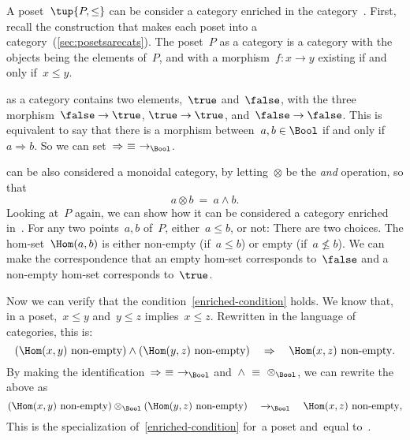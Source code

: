 \begin{example}
A poset~$\tup{P, \leq}$ can be consider a category enriched in the
category~\Bool. First, recall the construction that makes each poset into a
category~(\cref{sec:posetsarecats}). The poset~$P$ as a category is a category with the objects being the
elements of~$P$, and with a morphism~$f\colon x \to y$ existing if and only if~$x\leq y$.

\Bool as a category contains two elements,~$\true$ and~$\false$, with
the three morphism~$\false \to \true$, $\true \to \true$, and~$\false \to \false$. This is equivalent to say that there is a morphism between~$a, b \in \Bool$ if and only if~$a \Rightarrow b$. So we can set~$\Rightarrow\ \equiv\ \to_{\Bool}$.

\Bool can be also considered a monoidal category, by letting~$\otimes$ be
the \emph{and} operation, so that
\begin{equation}
a \otimes b\ =\ a \wedge b.
\end{equation}
Looking at~$P$ again, we can show how it can be considered a category enriched in~\Bool. For any two points~$a, b$ of~$P$, either~$a \leq b$, or not: There are two choices. The hom-set~$\Hom(a, b)$ is either non-empty
(if~$a \leq b$) or empty (if~$a \not\leq b$). We can make the correspondence that an empty hom-set corresponds to~$\false$ and a non-empty hom-set corresponds to~$\true$.

Now we can verify that the condition~\eqref{enriched-condition} holds. We
know that, in a poset,~$x \leq y$ and~$y \leq z$ implies~$x \leq z$.
%
Rewritten in the language of categories, this is:
\begin{equation}
(\Hom(x,y)\ \text{non-empty})
\wedge
(\Hom(y, z)\ \text{non-empty})
\quad
\Rightarrow
\quad
\Hom(x, z)\ \text{non-empty}.
\end{equation}
By making the identification~$\Rightarrow\ \equiv\ \to_{\Bool}$ and~$\wedge\ \equiv\ \otimes_{\Bool}$, we can rewrite the above as
\begin{equation}
(\Hom(x,y)\ \text{non-empty})
\otimes_{\Bool}
(\Hom(y, z)\ \text{non-empty})
\quad
\to_{\Bool}
\quad
\Hom(x, z)\ \text{non-empty},
\end{equation}
This is the specialization of~\eqref{enriched-condition}
for~\CatC a poset and~\CatD equal to~\Bool.
\end{example}

